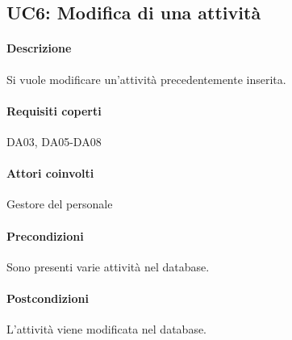 \subsection{UC6: Modifica di una attività}
\paragraph{Descrizione}
Si vuole modificare un'attività precedentemente inserita.
\paragraph{Requisiti coperti}
DA03, DA05-DA08
\paragraph{Attori coinvolti}
Gestore del personale
\paragraph{Precondizioni}
Sono presenti varie attività nel database.
\paragraph{Postcondizioni}
L'attività viene modificata nel database.
